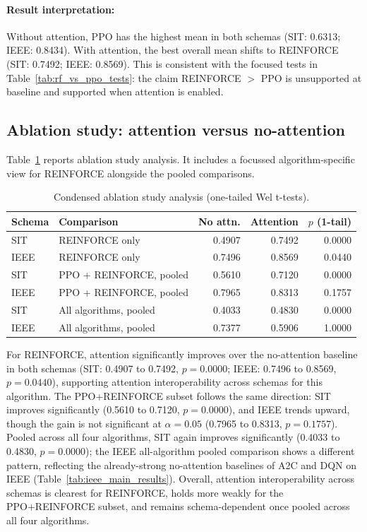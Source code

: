 \documentclass[sn-basic]{sn-jnl}%
\begin{document}
\paragraph{Result interpretation:}
Without attention, \textsc{PPO} has the highest mean in both schemas (SIT: 0.6313; IEEE: 0.8434). With attention, the best overall mean shifts to \textsc{REINFORCE} (SIT: 0.7492; IEEE: 0.8569). This is consistent with the focused tests in Table~\ref{tab:rf_vs_ppo_tests}: the claim \textsc{REINFORCE} $>$ \textsc{PPO} is unsupported at baseline and supported when attention is enabled.

\subsection{Ablation study: attention versus no-attention} \label{sec:ablation_results} %

Table~\ref{tab:ablation_condensed} reports ablation study analysis. It includes a focussed algorithm-specific view for \textsc{REINFORCE} alongside the pooled comparisons.

\begin{table}[htbp]
	\centering
	\caption{Condensed ablation study analysis (one-tailed Wel t-tests).}
	\label{tab:ablation_condensed}
	\begin{tabular}{l l r r r}
		\toprule
		\textbf{Schema} & \textbf{Comparison} & \textbf{No attn.} & \textbf{Attention} & \textbf{$p$ (1-tail)}\\
		\midrule
		SIT & \textsc{REINFORCE} only & 0.4907 & 0.7492 & 0.0000\\
		IEEE & \textsc{REINFORCE} only & 0.7496 & 0.8569 & 0.0440\\
		SIT & PPO + \textsc{REINFORCE}, pooled & 0.5610 & 0.7120 & 0.0000\\
		IEEE & PPO + \textsc{REINFORCE}, pooled & 0.7965 & 0.8313 & 0.1757\\
		SIT & All algorithms, pooled & 0.4033 & 0.4830 & 0.0000\\
		IEEE & All algorithms, pooled & 0.7377 & 0.5906 & 1.0000\\
		\bottomrule
	\end{tabular}
\end{table}

For \textsc{REINFORCE}, attention significantly improves over the no-attention baseline in both schemas (SIT: 0.4907 to 0.7492, $p=0.0000$; IEEE: 0.7496 to 0.8569, $p=0.0440$), supporting attention interoperability across schemas for this algorithm. The PPO+\textsc{REINFORCE} subset follows the same direction: SIT improves significantly (0.5610 to 0.7120, $p=0.0000$), and IEEE trends upward, though the gain is not significant at $\alpha=0.05$ (0.7965 to 0.8313, $p=0.1757$). Pooled across all four algorithms, SIT again improves significantly (0.4033 to 0.4830, $p=0.0000$); the IEEE all-algorithm pooled comparison shows a different pattern, reflecting the already-strong no-attention baselines of \textsc{A2C} and \textsc{DQN} on IEEE (Table~\ref{tab:ieee_main_results}). Overall, attention interoperability across schemas is clearest for \textsc{REINFORCE}, holds more weakly for the PPO+\textsc{REINFORCE} subset, and remains schema-dependent once pooled across all four algorithms.
\end{document}
